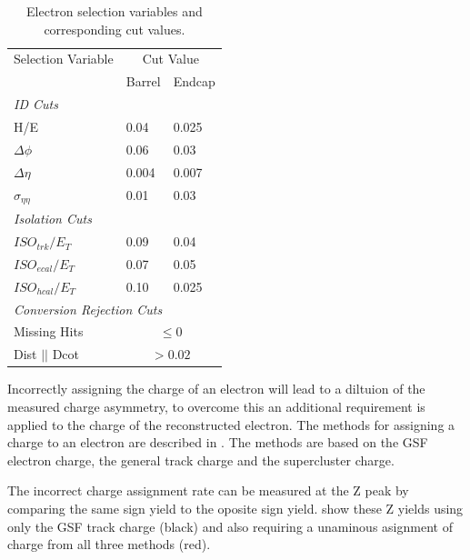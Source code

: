 \begin{table}[htbp]
  \begin{center}
    \leavevmode
    \begin{tabular}{lll} 
    \toprule
      Selection Variable & \multicolumn{2}{c}{Cut Value}\\
                         & Barrel & Endcap\\
      \midrule
      \multicolumn{3}{l}{\emph{ID Cuts}}\\ 
        H/E & 0.04 & 0.025 \\
        $\Delta\phi$ & 0.06 & 0.03 \\
        $\Delta\eta$ & 0.004 & 0.007  \\
        $\sigma_{\eta\eta}$ & 0.01 & 0.03 \\ \midrule
      \multicolumn{3}{l}{\emph{Isolation Cuts}}\\
        $ISO_{trk} / E_T $  & 0.09 & 0.04 \\
        $ISO_{ecal}/ E_T$  & 0.07 & 0.05 \\
        $ISO_{hcal}/ E_T$  & 0.10 & 0.025 \\ \midrule
      \multicolumn{3}{l}{\emph{Conversion Rejection Cuts}}\\ 
        Missing Hits  & \multicolumn{2}{c}{$\leq 0$}\\
        Dist $||$ Dcot   & \multicolumn{2}{c}{$>0.02$}\\
    \bottomrule
    \end{tabular}
    \caption{\label{tab:electronselection} Electron selection variables and corresponding cut values.}
  \end{center}
\end{table}

Incorrectly assigning the charge of an electron will lead to a diltuion of the
measured charge asymmetry, to overcome this an additional requirement is applied
to the charge of the reconstructed electron. The methods for assigning a charge
to an electron are described in . The methods are based
on the GSF electron charge, the general track charge and the supercluster
charge.

The incorrect charge assignment rate can be measured at the Z peak by comparing the same
sign \HepProcess{\PZ\to\Pepm\Pepm} yield to the oposite sign
\HepProcess{\PZ\to\Pepm\Pemp} yield.  show these Z yields
using only the \ac{GSF} track charge (black) and also requiring a unaminous
asignment of charge from all three methods (red). 

